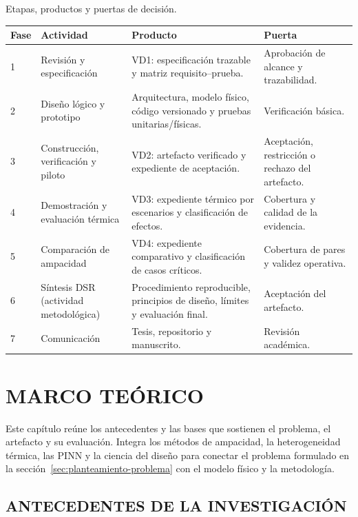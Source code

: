 \documentclass[11pt,a4paper,oneside]{report}
\begin{document}
\begin{procedure}[htbp]
\caption{Etapas, productos y puertas de decisión.}
\label{proc:etapas}
\begin{tabularx}{\textwidth}{C{1.0cm}L{3.4cm}Y L{3.2cm}}
\toprule
\textbf{Fase} & \textbf{Actividad} & \textbf{Producto} & \textbf{Puerta} \\
 & Revisión y especificación & VD1: especificación trazable y matriz requisito--prueba. & Aprobación de alcance y trazabilidad. \\
  2 & Diseño lógico y prototipo & Arquitectura, modelo físico, código versionado y pruebas unitarias/físicas. & Verificación básica. \\
  3 & Construcción, verificación y piloto & VD2: artefacto verificado y expediente de aceptación. & Aceptación, restricción o rechazo del artefacto. \\
  4 & Demostración y evaluación térmica & VD3: expediente térmico por escenarios y clasificación de efectos. & Cobertura y calidad de la evidencia. \\
  5 & Comparación de ampacidad & VD4: expediente comparativo y clasificación de casos críticos. & Cobertura de pares y validez operativa. \\
6 & Síntesis DSR (actividad metodológica) & Procedimiento reproducible, principios de diseño, límites y evaluación final. & Aceptación del artefacto. \\
7 & Comunicación & Tesis, repositorio y manuscrito. & Revisión académica. \\
\bottomrule
\end{tabularx}
\end{procedure}

\chapter{MARCO TEÓRICO}
\label{ch:marco-teorico}
\thispagestyle{empty}

Este capítulo reúne los antecedentes y las bases que sostienen el problema, el artefacto y su evaluación. Integra los métodos de ampacidad, la heterogeneidad térmica, las PINN y la ciencia del diseño para conectar el problema formulado en la sección~\ref{sec:planteamiento-problema} con el modelo físico y la metodología.

\section{ANTECEDENTES DE LA INVESTIGACIÓN}
\label{sec:antecedentes}
\end{document}
